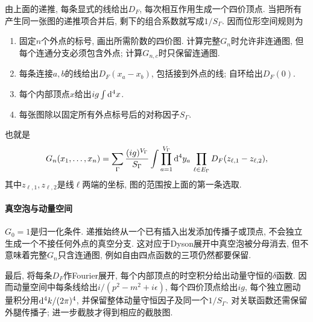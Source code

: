 由上面的递推, 每条显式的线给出$D_F$, 每次相互作用生成一个四价顶点. 当把所有产生同一张图的递推项合并后, 剩下的组合系数就写成$1/S_\Gamma$. 因而位形空间规则为
\begin{enumerate}
    \item 固定$n$个外点的标号, 画出所需阶数的四价图. 计算完整$G_n$时允许非连通图, 但每个连通分支必须包含外点; 计算$G_{n,c}$时只保留连通图.
    \item 每条连接$a,b$的线给出$D_F(x_a-x_b)$, 包括接到外点的线; 自环给出$D_F(0)$.
    \item 每个内部顶点$x$给出$ig\int\mathrm d^4x$.
    \item 每张图除以固定所有外点标号后的对称因子$S_\Gamma$.
\end{enumerate}
也就是
\begin{equation}
    G_n(x_1,\ldots,x_n)
    =\sum_{\Gamma}\frac{(ig)^{V_\Gamma}}{S_\Gamma}
    \int\prod_{a=1}^{V_\Gamma}\mathrm d^4y_a\,
    \prod_{\ell\in E_\Gamma}D_F(z_{\ell,1}-z_{\ell,2}),
    \label{sd-phi4-graph-sum}
\end{equation}
其中$z_{\ell,1},z_{\ell,2}$是线$\ell$两端的坐标, 图的范围按上面的第一条选取.

\paragraph{真空泡与动量空间}
$G_0=1$是归一化条件. 递推始终从一个已有插入出发添加传播子或顶点, 不会独立生成一个不接任何外点的真空分支. 这对应于Dyson展开中真空泡被分母消去, 但不意味着完整$G_n$只含连通图, 例如自由四点函数的三项仍然都要保留.

最后, 将每条$D_F$作Fourier展开, 每个内部顶点的时空积分给出动量守恒的$\delta$函数. 因而动量空间中每条线给出$i/(p^2-m^2+i\epsilon)$, 每个四价顶点给出$ig$, 每个独立圈动量积分用$\mathrm d^4k/(2\pi)^4$, 并保留整体动量守恒因子及同一个$1/S_\Gamma$. 对关联函数还需保留外腿传播子; 进一步截肢才得到相应的截肢图.
